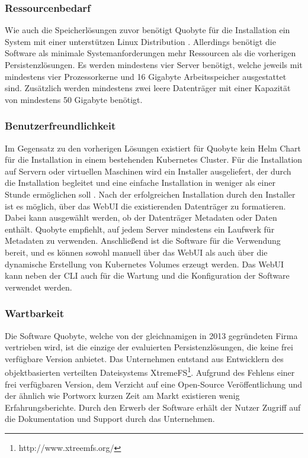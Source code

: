\subsubsection{Ressourcenbedarf}
Wie auch die Speicherlösungen zuvor benötigt Quobyte für die Installation ein System mit einer unterstützen Linux Distribution \cite{quobyte:whitepaper}. Allerdings benötigt die Software als minimale Systemanforderungen mehr Ressourcen als die vorherigen Persistenzlösungen. Es werden mindestens vier Server benötigt, welche jeweils mit mindestens vier Prozessorkerne und 16 Gigabyte Arbeitsspeicher ausgestattet sind. Zusätzlich werden mindestens zwei leere Datenträger mit einer Kapazität von mindestens 50 Gigabyte benötigt.

\subsubsection{Benutzerfreundlichkeit}
Im Gegensatz zu den vorherigen Lösungen existiert für Quobyte kein Helm Chart für die Installation in einem bestehenden Kubernetes Cluster. Für die Installation auf Servern oder virtuellen Maschinen wird ein Installer ausgeliefert, der durch die Installation begleitet und eine einfache Installation in weniger als einer Stunde ermöglichen soll \cite{quobyte:whitepaper}. Nach der erfolgreichen Installation durch den Installer ist es möglich, über das WebUI die existierenden Datenträger zu formatieren. Dabei kann ausgewählt werden, ob der Datenträger Metadaten oder Daten enthält. Quobyte empfiehlt, auf jedem Server mindestens ein Laufwerk für Metadaten zu verwenden. Anschließend ist die Software für die Verwendung bereit, und es können sowohl manuell über das WebUI als auch über die dynamische Erstellung von Kubernetes Volumes erzeugt werden. Das WebUI kann neben der \ac{CLI} auch für die Wartung und die Konfiguration der Software verwendet werden.

\subsubsection{Wartbarkeit}
Die Software Quobyte, welche von der gleichnamigen in 2013 gegründeten \cite{quobyte:about} Firma vertrieben wird, ist die einzige der evaluierten Persistenzlösungen, die keine frei verfügbare Version anbietet. Das Unternehmen entstand aus Entwicklern des objektbasierten verteilten Dateisystems XtremeFS\footnote{http://www.xtreemfs.org/}. Aufgrund des Fehlens einer frei verfügbaren Version, dem Verzicht auf eine Open-Source Veröffentlichung und der ähnlich wie Portworx kurzen Zeit am Markt existieren wenig Erfahrungsberichte. Durch den Erwerb der Software erhält der Nutzer Zugriff auf die Dokumentation und Support durch das Unternehmen.

